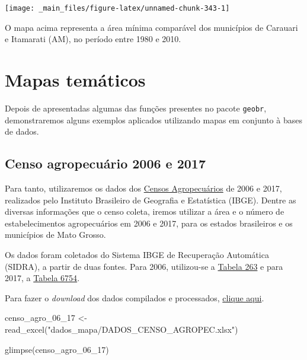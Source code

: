 \documentclass[
  brazilian,
]{book}
\newenvironment{Shaded}{\begin{snugshade}}{\end{snugshade}}
\newcommand{\FunctionTok}[1]{\textcolor[rgb]{0.00,0.00,0.00}{#1}}
\newcommand{\NormalTok}[1]{#1}
\newcommand{\OtherTok}[1]{\textcolor[rgb]{0.56,0.35,0.01}{#1}}
\newcommand{\StringTok}[1]{\textcolor[rgb]{0.31,0.60,0.02}{#1}}
\begin{document}
\begin{center}\texttt{[image: \_main\_files/figure-latex/unnamed-chunk-343-1]} \end{center}

O mapa acima representa a área mínima comparável dos municípios de Carauari e Itamarati (AM), no período entre 1980 e 2010.

\hypertarget{mapas-temuxe1ticos}{%
\section{Mapas temáticos}\label{mapas-temuxe1ticos}}

Depois de apresentadas algumas das funções presentes no pacote \texttt{geobr}, demonstraremos alguns exemplos aplicados utilizando mapas em conjunto à bases de dados.

\hypertarget{censo-agropecuuxe1rio-2006-e-2017}{%
\subsection{Censo agropecuário 2006 e 2017}\label{censo-agropecuuxe1rio-2006-e-2017}}

Para tanto, utilizaremos os dados dos \href{https://www.ibge.gov.br/estatisticas/economicas/agricultura-e-pecuaria/21814-2017-censo-agropecuario.html?=\&t=destaques}{Censos Agropecuários} de 2006 e 2017, realizados pelo Instituto Brasileiro de Geografia e Estatística (IBGE). Dentre as diversas informações que o censo coleta, iremos utilizar a área e o número de estabelecimentos agropecuários em 2006 e 2017, para os estados brasileiros e os municípios de Mato Grosso.

Os dados foram coletados do Sistema IBGE de Recuperação Automática (SIDRA), a partir de duas fontes. Para 2006, utilizou-se a \href{https://sidra.ibge.gov.br/tabela/263}{Tabela 263} e para 2017, a \href{https://sidra.ibge.gov.br/tabela/6754}{Tabela 6754}.

Para fazer o \emph{download} dos dados compilados e processados, \href{https://github.com/gustavojy/ApostilaCD-R/blob/main/dados_zip/dados_mapa.zip?raw=true}{clique aqui}.

\begin{Shaded}
\begin{Highlighting}[]
\NormalTok{censo\_agro\_06\_17 }\OtherTok{\textless{}{-}} \FunctionTok{read\_excel}\NormalTok{(}\StringTok{"dados\_mapa/DADOS\_CENSO\_AGROPEC.xlsx"}\NormalTok{)}

\FunctionTok{glimpse}\NormalTok{(censo\_agro\_06\_17)}
\end{Highlighting}
\end{Shaded}
\end{document}
